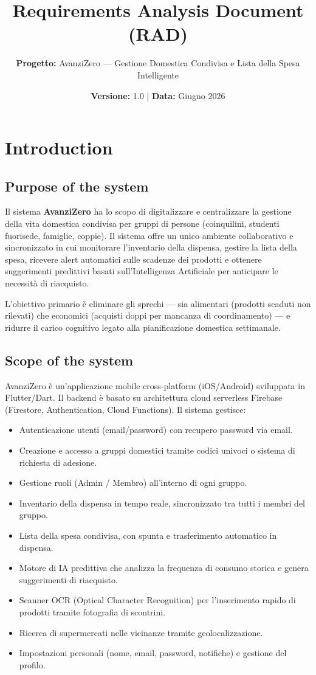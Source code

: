 \documentclass[12pt,a4paper]{article}
\title{Requirements Analysis Document (RAD)}
\author{\textbf{Progetto:} AvanziZero — Gestione Domestica Condivisa e Lista della Spesa Intelligente}
\date{\textbf{Versione:} 1.0 | \textbf{Data:} Giugno 2026}
\begin{document}
\maketitle

\section{Introduction}

\subsection{Purpose of the system}
Il sistema \textbf{AvanziZero} ha lo scopo di digitalizzare e centralizzare la gestione della vita domestica condivisa per gruppi di persone (coinquilini, studenti fuorisede, famiglie, coppie). Il sistema offre un unico ambiente collaborativo e sincronizzato in cui monitorare l'inventario della dispensa, gestire la lista della spesa, ricevere alert automatici sulle scadenze dei prodotti e ottenere suggerimenti predittivi basati sull'Intelligenza Artificiale per anticipare le necessità di riacquisto.

L'obiettivo primario è eliminare gli sprechi — sia alimentari (prodotti scaduti non rilevati) che economici (acquisti doppi per mancanza di coordinamento) — e ridurre il carico cognitivo legato alla pianificazione domestica settimanale.

\subsection{Scope of the system}
AvanziZero è un'applicazione mobile cross-platform (iOS/Android) sviluppata in Flutter/Dart. Il backend è basato su architettura cloud serverless Firebase (Firestore, Authentication, Cloud Functions). Il sistema gestisce:
\begin{itemize}
    \item Autenticazione utenti (email/password) con recupero password via email.
    \item Creazione e accesso a gruppi domestici tramite codici univoci o sistema di richiesta di adesione.
    \item Gestione ruoli (Admin / Membro) all'interno di ogni gruppo.
    \item Inventario della dispensa in tempo reale, sincronizzato tra tutti i membri del gruppo.
    \item Lista della spesa condivisa, con spunta e trasferimento automatico in dispensa.
    \item Motore di IA predittiva che analizza la frequenza di consumo storica e genera suggerimenti di riacquisto.
    \item Scanner OCR (Optical Character Recognition) per l'inserimento rapido di prodotti tramite fotografia di scontrini.
    \item Ricerca di supermercati nelle vicinanze tramite geolocalizzazione.
    \item Impostazioni personali (nome, email, password, notifiche) e gestione del profilo.
\end{itemize}
\end{document}
